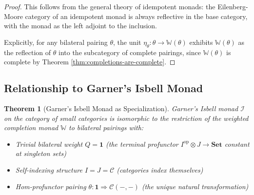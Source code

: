 \documentclass[11pt]{article}
\theoremstyle{plain}
\newtheorem{theorem}{Theorem}[section]
\theoremstyle{definition}
\theoremstyle{remark}
\newcommand{\C}{\mathcal{C}}
\newcommand{\op}{\mathrm{op}}
\begin{document}
\begin{proof}
This follows from the general theory of idempotent monads: the Eilenberg-Moore category of an idempotent monad is always reflective in the base category, with the monad as the left adjoint to the inclusion.

Explicitly, for any bilateral pairing $\theta$, the unit $\eta_\theta : \theta \to \mathbb{W}(\theta)$ exhibits $\mathbb{W}(\theta)$ as the reflection of $\theta$ into the subcategory of complete pairings, since $\mathbb{W}(\theta)$ is complete by Theorem \ref{thm:completions-are-complete}.
\end{proof}

\subsection{Relationship to Garner's Isbell Monad}

\begin{theorem}[Garner's Isbell Monad as Specialization]\label{thm:garner-specialization}
Garner's Isbell monad $\mathcal{I}$ on the category of small categories is isomorphic to the restriction of the weighted completion monad $\mathbb{W}$ to bilateral pairings with:
\begin{itemize}
\item Trivial bilateral weight $Q = \mathbf{1}$ (the terminal profunctor $I^{\op} \otimes J \to \mathbf{Set}$ constant at singleton sets)
\item Self-indexing structure $I = J = \C$ (categories index themselves)  
\item Hom-profunctor pairing $\theta : \mathbf{1} \Rightarrow \C(-, -)$ (the unique natural transformation)
\end{itemize}
\end{theorem}
\end{document}

